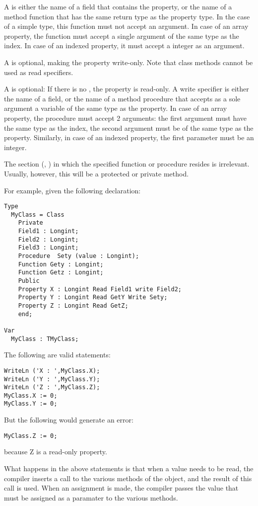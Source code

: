 A   is either the name of a field that contains the
property, or the name of a method function that has the same return type as
the property type. In the case of a simple type, this
function must not accept an argument. In case of an array property, the
function must accept a single argument of the same type as the index.
In case of an indexed property, it must accept a integer as an argument.

A  is optional, making the property write-only. 
Note that class methods cannot be used as read specifiers.

A   is optional: If there is no , the
property is read-only. A write specifier is either the name of a field, or
the name of a method procedure that accepts as a sole argument a variable of
the same type as the property. In case of an array property, the procedure
must accept 2 arguments: the first argument must have the same type as the
index, the second argument must be of the same type as the property.
Similarly, in case of an indexed property, the first parameter must be an integer.

The section  (, ) 
in which the specified function or procedure resides is irrelevant. Usually, 
however, this will be a protected or private method.

For example, given the following declaration:
\begin{verbatim}
Type
  MyClass = Class
    Private
    Field1 : Longint;
    Field2 : Longint;
    Field3 : Longint;
    Procedure  Sety (value : Longint);
    Function Gety : Longint;
    Function Getz : Longint;
    Public
    Property X : Longint Read Field1 write Field2;
    Property Y : Longint Read GetY Write Sety;
    Property Z : Longint Read GetZ;
    end;

Var 
  MyClass : TMyClass;
\end{verbatim}
The following are valid statements:
\begin{verbatim}
WriteLn ('X : ',MyClass.X);
WriteLn ('Y : ',MyClass.Y);
WriteLn ('Z : ',MyClass.Z);
MyClass.X := 0;
MyClass.Y := 0;
\end{verbatim}
But the following would generate an error:
\begin{verbatim}
MyClass.Z := 0;
\end{verbatim}
because Z is a read-only property.

What happens in the above statements is that when a value needs to be read,
the compiler inserts a call to the various  methods of the
object, and the result of this call is used. When an assignment is made,
the compiler passes the value that must be assigned as a paramater to
the various  methods.


